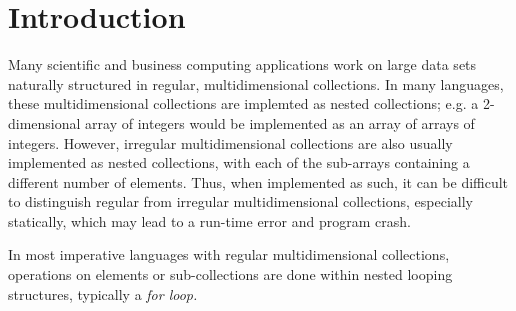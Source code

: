 \chapter{Introduction}
Many scientific and business computing applications work on large data sets naturally structured in regular, multidimensional collections.
In many languages, these multidimensional collections are implemted as nested collections; e.g. a 2-dimensional array of integers would be implemented as an array of arrays of integers.
However, irregular multidimensional collections are also usually implemented as nested collections, with each of the sub-arrays containing a different number of elements.
Thus, when implemented as such, it can be difficult to distinguish regular from irregular multidimensional collections, especially statically, which may lead to a run-time error and program crash.

In most imperative languages with regular multidimensional collections, operations on elements or sub-collections are done within nested looping structures, typically a \it{for loop}.

